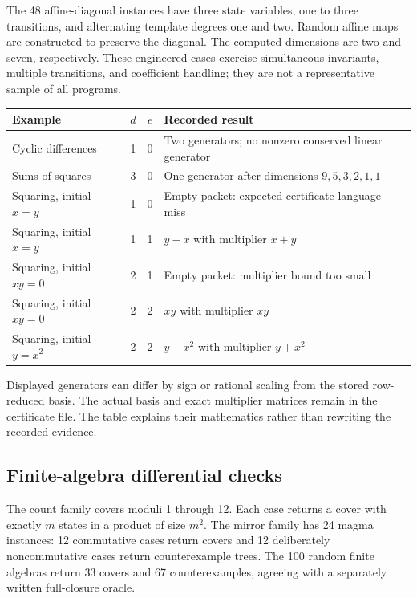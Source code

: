 The 48 affine-diagonal instances have three state variables, one to three
transitions, and alternating template degrees one and two. Random affine maps
are constructed to preserve the diagonal. The computed dimensions are two and
seven, respectively. These engineered cases exercise simultaneous invariants,
multiple transitions, and coefficient handling; they are not a representative
sample of all programs.

\begin{center}
\small
\begin{tabularx}{\textwidth}{@{}YrrY@{}}
\toprule
Example & $d$ & $e$ & Recorded result \\
\midrule
Cyclic differences & 1 & 0 & Two generators; no nonzero conserved linear generator \\
Sums of squares & 3 & 0 & One generator after dimensions $9,5,3,2,1,1$ \\
Squaring, initial $x=y$ & 1 & 0 & Empty packet: expected certificate-language miss \\
Squaring, initial $x=y$ & 1 & 1 & $y-x$ with multiplier $x+y$ \\
Squaring, initial $xy=0$ & 2 & 1 & Empty packet: multiplier bound too small \\
Squaring, initial $xy=0$ & 2 & 2 & $xy$ with multiplier $xy$ \\
Squaring, initial $y=x^2$ & 2 & 2 & $y-x^2$ with multiplier $y+x^2$ \\
\bottomrule
\end{tabularx}
\end{center}

Displayed generators can differ by sign or rational scaling from the stored
row-reduced basis. The actual basis and exact multiplier matrices remain in the
certificate file. The table explains their mathematics rather than rewriting
the recorded evidence.

\subsection{Finite-algebra differential checks}
The count family covers moduli 1 through 12. Each case returns a cover with
exactly $m$ states in a product of size $m^2$. The mirror family has 24 magma
instances: 12 commutative cases return covers and 12 deliberately noncommutative
cases return counterexample trees. The 100 random finite algebras return 33
covers and 67 counterexamples, agreeing with a separately written full-closure
oracle.

